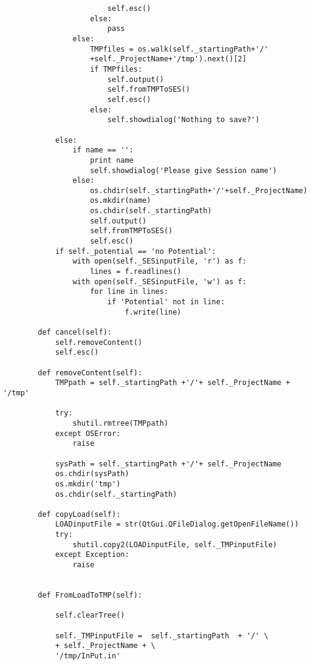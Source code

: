 \begin{verbatim}
                        self.esc()
                    else:
                        pass
                else:
                    TMPfiles = os.walk(self._startingPath+'/'
                    +self._ProjectName+'/tmp').next()[2]
                    if TMPfiles:
                        self.output()
                        self.fromTMPToSES()
                        self.esc()
                    else:
                        self.showdialog('Nothing to save?')
    
            else:
                if name == '':
                    print name
                    self.showdialog('Please give Session name')
                else:
                    os.chdir(self._startingPath+'/'+self._ProjectName)
                    os.mkdir(name)
                    os.chdir(self._startingPath)
                    self.output()
                    self.fromTMPToSES()
                    self.esc()
            if self._potential == 'no Potential':
                with open(self._SESinputFile, 'r') as f:
                    lines = f.readlines()
                with open(self._SESinputFile, 'w') as f:
                    for line in lines:
                        if 'Potential' not in line:
                            f.write(line)
                
        def cancel(self):
            self.removeContent()
            self.esc()
    
        def removeContent(self):
            TMPpath = self._startingPath +'/'+ self._ProjectName + '/tmp'
    
            try:
                shutil.rmtree(TMPpath)
            except OSError:
                raise
                
            sysPath = self._startingPath +'/'+ self._ProjectName
            os.chdir(sysPath)
            os.mkdir('tmp')
            os.chdir(self._startingPath)
    
        def copyLoad(self):
            LOADinputFile = str(QtGui.QFileDialog.getOpenFileName())
            try:
                shutil.copy2(LOADinputFile, self._TMPinputFile)
            except Exception:
                raise
    
    
        def FromLoadToTMP(self):
            
            self.clearTree()
            
            self._TMPinputFile =  self._startingPath  + '/' \
            + self._ProjectName + \
            '/tmp/InPut.in'
            

\end{verbatim}
